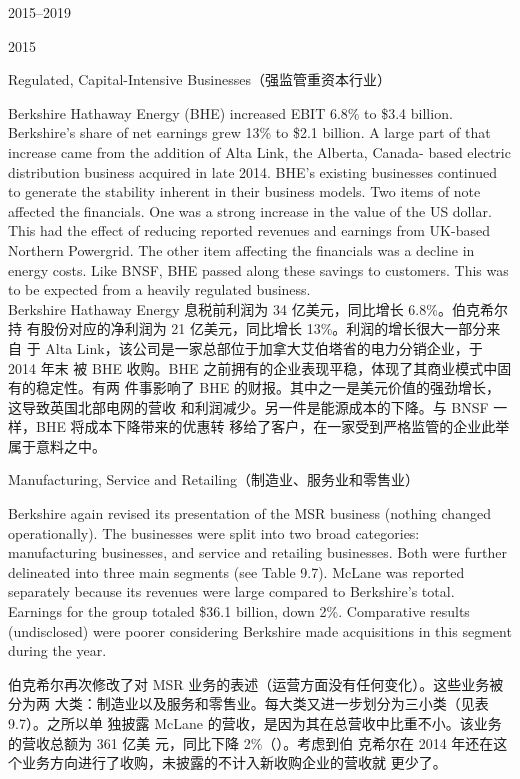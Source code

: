 \begin{chapter}{2015--2019}
\begin{section}{2015}
\begin{subsection}{Regulated, Capital-Intensive Businesses（强监管重资本行业）}
\begin{verseparallel}
  {
    Berkshire Hathaway Energy (BHE) increased EBIT 6.8\% to \$3.4 billion.
    Berkshire's share of net earnings grew 13\% to \$2.1 billion. A large part
    of that increase came from the addition of Alta Link, the Alberta, Canada-
    based electric distribution business acquired in late 2014. BHE's existing
    businesses continued to generate the stability inherent in their business
    models. Two items of note affected the financials. One was a strong increase
    in the value of the US dollar. This had the effect of reducing reported
    revenues and earnings from UK-based Northern Powergrid. The other item
    affecting the financials was a decline in energy costs. Like BNSF, BHE
    passed along these savings to customers. This was to be expected from a
    heavily regulated business. \\
  }
  {
    Berkshire Hathaway Energy 息税前利润为 34 亿美元，同比增长 6.8\%。伯克希尔持
    有股份对应的净利润为 21 亿美元，同比增长 13\%。利润的增长很大一部分来自
    于 Alta Link，该公司是一家总部位于加拿大艾伯塔省的电力分销企业，于 2014 年末
    被 BHE 收购。BHE 之前拥有的企业表现平稳，体现了其商业模式中固有的稳定性。有两
    件事影响了 BHE 的财报。其中之一是美元价值的强劲增长，这导致英国北部电网的营收
    和利润减少。另一件是能源成本的下降。与 BNSF 一样，BHE 将成本下降带来的优惠转
    移给了客户，在一家受到严格监管的企业此举属于意料之中。
  }
\end{verseparallel}
\end{subsection}

\begin{subsection}{Manufacturing, Service and Retailing（制造业、服务业和零售业）}

\begin{verseparallel}
  {

    Berkshire again revised its presentation of the MSR business (nothing
    changed operationally). The businesses were split into two broad categories:
    manufacturing businesses, and service and retailing businesses. Both were
    further delineated into three main segments (see Table 9.7). McLane was
    reported separately because its revenues were large compared to Berkshire's
    total. Earnings for the group totaled \$36.1 billion, down 2\%. Comparative
    results (undisclosed) were poorer considering Berkshire made acquisitions in
    this segment during the year. \\
  }
  {
    伯克希尔再次修改了对 MSR 业务的表述（运营方面没有任何变化）。这些业务被分为两
    大类：制造业以及服务和零售业。每大类又进一步划分为三小类（见表9.7）。之所以单
    独披露 McLane 的营收，是因为其在总营收中比重不小。该业务的营收总额为 361 亿美
    元，同比下降 2\%（{\color{red}{这里原文有误，应为营收，而非利润}}）。考虑到伯
    克希尔在 2014 年还在这个业务方向进行了收购，未披露的不计入新收购企业的营收就
    更少了。
  }
\end{verseparallel}


\end{subsection}
\end{section}
\end{chapter}
